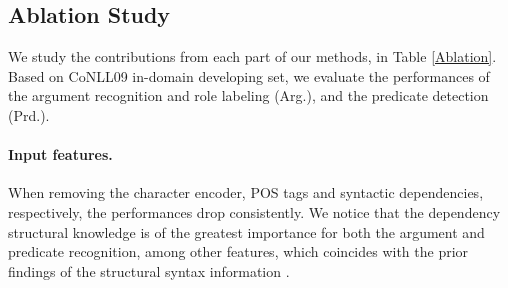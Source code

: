 \documentclass[letterpaper]{article} %
\begin{document}
\begin{CJK}{UTF8}{gbsn}
\begin{table}[!t]
\begin{center}
\end{center}
  \caption{
  Ablation results (F1 score).
  }
  \label{Ablation}
\end{table}





\subsection{Ablation Study}
We study the contributions from each part of our methods, in Table \ref{Ablation}.
Based on CoNLL09 in-domain developing set, we evaluate the performances of the argument recognition and role labeling (Arg.), and the predicate detection (Prd.).



\paragraph{Input features.}
When removing the character encoder, POS tags and syntactic dependencies, respectively, the performances drop consistently.
We notice that the dependency structural knowledge is of the greatest importance for both the argument and predicate recognition, among other features, which coincides with the prior findings of the structural syntax information \cite{marcheggiani-etal-2017-simple,zhang-etal-2019-syntax-enhanced,Crossfei9165903}.





\end{CJK}
\end{document}
